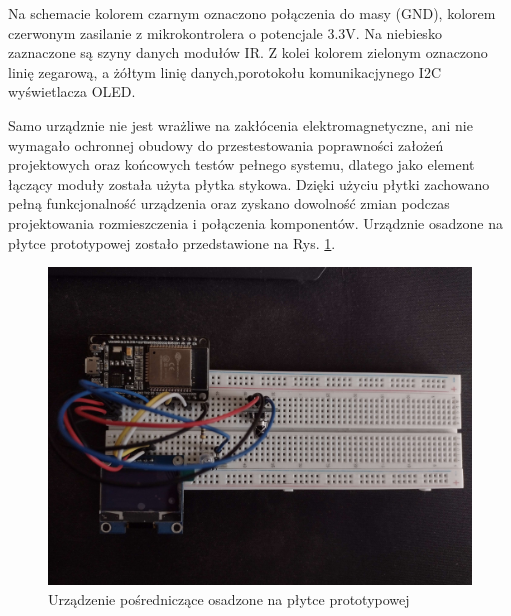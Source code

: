 \documentclass[12pt,twoside]{article}
\begin{document}
Na schemacie kolorem czarnym oznaczono połączenia do masy (GND), kolorem czerwonym zasilanie z mikrokontrolera o potencjale 3.3V. Na niebiesko zaznaczone są szyny danych modułów IR. Z kolei kolorem zielonym oznaczono linię zegarową, a żółtym linię danych,porotokołu komunikacjynego I2C wyświetlacza OLED.

Samo urządznie nie jest wrażliwe na zakłócenia elektromagnetyczne, ani nie wymagało ochronnej obudowy do przestestowania poprawności założeń projektowych oraz końcowych testów pełnego systemu, dlatego jako element łączący moduły została użyta płytka stykowa. Dzięki użyciu płytki zachowano pełną funkcjonalność urządzenia oraz zyskano dowolność zmian podczas projektowania rozmieszczenia i połączenia komponentów. Urządznie osadzone na płytce prototypowej zostało przedstawione na Rys. \ref*{Fig:deviceOnBoard}.
\begin{figure}[ht]
   \centering
   \includegraphics[width=12cm]{images/deviceOnBoard.jpg}
   \caption{Urządzenie pośredniczące osadzone na płytce prototypowej}
   \label{Fig:deviceOnBoard}
\end{figure}
\end{document}
